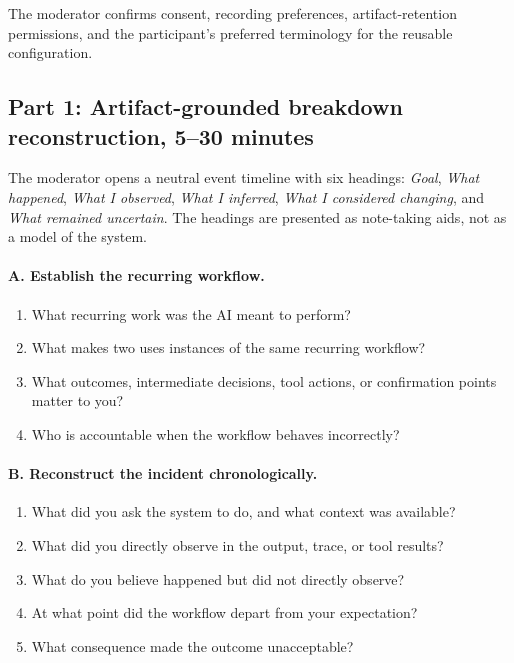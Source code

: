 The moderator confirms consent, recording preferences, artifact-retention
permissions, and the participant's preferred terminology for the reusable
configuration.

\subsection{Part 1: Artifact-grounded breakdown reconstruction, 5--30 minutes}

The moderator opens a neutral event timeline with six headings: \emph{Goal},
\emph{What happened}, \emph{What I observed}, \emph{What I inferred},
\emph{What I considered changing}, and \emph{What remained uncertain}. The
headings are presented as note-taking aids, not as a model of the system.

\paragraph{A. Establish the recurring workflow.}
\begin{enumerate}[leftmargin=*]
    \item What recurring work was the AI meant to perform?
    \item What makes two uses instances of the same recurring workflow?
    \item What outcomes, intermediate decisions, tool actions, or confirmation
    points matter to you?
    \item Who is accountable when the workflow behaves incorrectly?
\end{enumerate}

\paragraph{B. Reconstruct the incident chronologically.}
\begin{enumerate}[leftmargin=*]
    \item What did you ask the system to do, and what context was available?
    \item What did you directly observe in the output, trace, or tool results?
    \item What do you believe happened but did not directly observe?
    \item At what point did the workflow depart from your expectation?
    \item What consequence made the outcome unacceptable?
\end{enumerate}

